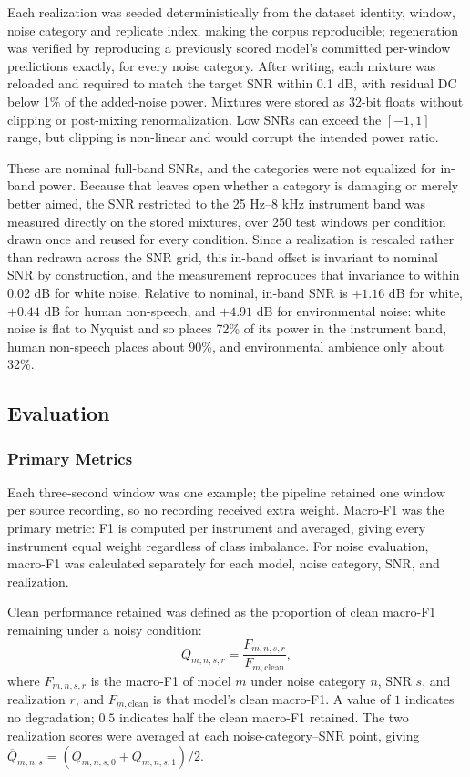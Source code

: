 \documentclass[conference]{IEEEtran}
\begin{document}
Each realization was seeded deterministically from the dataset identity, window, noise category and replicate index, making the corpus reproducible; regeneration was verified by reproducing a previously scored model's committed per-window predictions exactly, for every noise category. After writing, each mixture was reloaded and required to match the target SNR within 0.1 dB, with residual DC below 1\% of the added-noise power. Mixtures were stored as 32-bit floats without clipping or post-mixing renormalization. Low SNRs can exceed the $[-1, 1]$ range, but clipping is non-linear and would corrupt the intended power ratio.

These are nominal full-band SNRs, and the categories were not equalized for in-band power. Because that leaves open whether a category is damaging or merely better aimed, the SNR restricted to the 25 Hz--8 kHz instrument band was measured directly on the stored mixtures, over 250 test windows per condition drawn once and reused for every condition. Since a realization is rescaled rather than redrawn across the SNR grid, this in-band offset is invariant to nominal SNR by construction, and the measurement reproduces that invariance to within 0.02 dB for white noise. Relative to nominal, in-band SNR is $+1.16$ dB for white, $+0.44$ dB for human non-speech, and $+4.91$ dB for environmental noise: white noise is flat to Nyquist and so places 72\% of its power in the instrument band, human non-speech places about 90\%, and environmental ambience only about 32\%.

\subsection{Evaluation}
\subsubsection{Primary Metrics}

Each three-second window was one example; the pipeline retained one window per source recording, so no recording received extra weight. Macro-F1 was the primary metric: F1 is computed per instrument and averaged, giving every instrument equal weight regardless of class imbalance. For noise evaluation, macro-F1 was calculated separately for each model, noise category, SNR, and realization.

Clean performance retained was defined as the proportion of clean macro-F1 remaining under a noisy condition:
\begin{equation}
Q_{m,n,s,r}
=
\frac{
F_{m,n,s,r}
}{
F_{m,\mathrm{clean}}
},
\label{eq:retention}
\end{equation}
where \(F_{m,n,s,r}\) is the macro-F1 of model \(m\) under noise category \(n\), SNR \(s\), and realization \(r\), and \(F_{m,\mathrm{clean}}\) is that model's clean macro-F1. A value of \(1\) indicates no degradation; \(0.5\) indicates half the clean macro-F1 retained. The two realization scores were averaged at each noise-category--SNR point, giving \(\overline{Q}_{m,n,s}=(Q_{m,n,s,0}+Q_{m,n,s,1})/2\).
\end{document}
